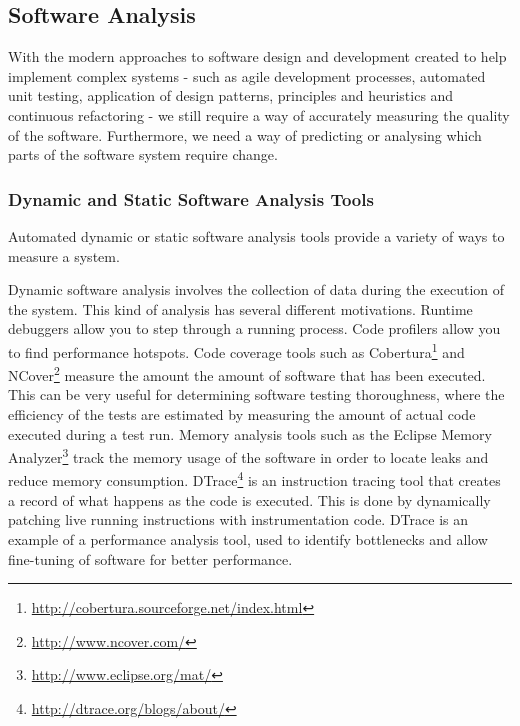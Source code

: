 \subsection{Software Analysis}

With the modern approaches to software design and development created to help implement complex systems - such as agile development processes, automated unit testing, application of design patterns, principles and heuristics and continuous refactoring - we still require a way of accurately measuring the quality of the software.  Furthermore, we need a way of predicting or analysing which parts of the software system require change.

\subsubsection{Dynamic and Static Software Analysis Tools}

Automated dynamic or static software analysis tools provide a variety of ways to measure a system. 

Dynamic software analysis involves the collection of data during the execution of the system. This kind of analysis has several different motivations. Runtime debuggers allow you to step through a running process. Code profilers allow you to find performance hotspots. Code coverage tools such as Cobertura\footnote{\url{http://cobertura.sourceforge.net/index.html}} and NCover\footnote{\url{http://www.ncover.com/}} measure the amount the amount of software that has been executed. This can be very useful for determining software testing thoroughness, where the efficiency of the tests are estimated by measuring the amount of actual code executed during a test run. Memory analysis tools such as the Eclipse Memory Analyzer\footnote{\url{http://www.eclipse.org/mat/}} track the memory usage of the software in order to locate leaks and reduce memory consumption.  DTrace\footnote{\url{http://dtrace.org/blogs/about/}} is an instruction tracing tool that creates a record of what happens as the code is executed. This is done by dynamically patching live running instructions with instrumentation code. DTrace is an example of a performance analysis tool, used to identify bottlenecks and allow fine-tuning of software for better performance.

